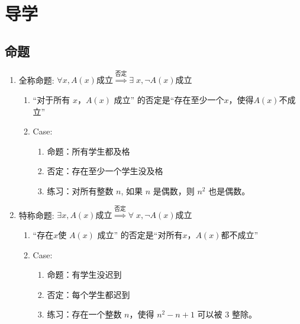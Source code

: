 \documentclass[a4paper,12pt]{article}
\begin{document}


    \section{导学}

    \subsection{命题}

    \begin{enumerate}
        \item 全称命题: $\forall x, A(x) \text{成立} \overset{\text{否定}}{\Rightarrow} \exists \; x, \neg{A(x)}\text{成立}$
        \begin{enumerate}
            \item “对于所有 $x$，$A(x)$ 成立” 的否定是“存在至少一个$x$，使得$A(x)$不成立”
            \item Case:
            \begin{enumerate}
                \item 命题：所有学生都及格
                \item 否定：存在至少一个学生没及格
                \item 练习：对所有整数 $n$, 如果 $n$ 是偶数，则 $n^2$ 也是偶数。
            \end{enumerate}
        \end{enumerate}
        \item 特称命题: $\exists x, A(x) \text{成立} \overset{\text{否定}}{\Rightarrow} \forall \; x, \neg{A(x)}\text{成立}$
        \begin{enumerate}
            \item “存在$x$使 $A(x)$ 成立” 的否定是“对所有$x$，$A(x)$都不成立”
            \item Case:
            \begin{enumerate}
                \item 命题：有学生没迟到
                \item 否定：每个学生都迟到
                \item 练习：存在一个整数 $n$，使得 $n^2 - n + 1$ 可以被 $3$ 整除。
            \end{enumerate}

\end{enumerate}
\end{enumerate}
\end{document}
